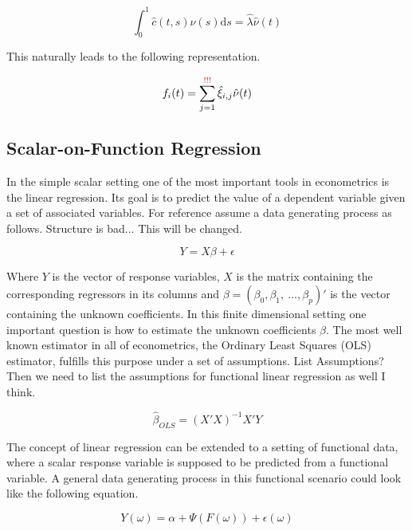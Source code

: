 \documentclass[11pt,twoside,a4paper]{article}
\begin{document}
	\begin{equation}
		\int_{0}^{1}\hat{c}(t,s)\hat{\nu}(s) \mathrm{d}s = \hat{\lambda} \hat{\nu}(t)
	\end{equation}
	
	This naturally leads to the following representation.
	
	\begin{equation}
		f_i(t) = \sum_{j = 1}^{{\color{red} !!!}} \hat{\xi}_{i,j} \hat{\nu}(t)
	\end{equation}
	
	\subsection{Scalar-on-Function Regression}
	In the simple scalar setting one of the most important tools in econometrics is the linear regression. Its goal is to predict the value of a dependent variable given a set of associated variables. For reference assume a data generating process as follows. {\color{red} Structure is bad... This will be changed.}
	
	\begin{equation}
		Y = X\beta + \epsilon
	\end{equation}
	
	Where $Y$ is the vector of response variables, $X$ is the matrix containing the corresponding regressors in its columns and $\beta = (\beta_0, \beta_1, \: \dots, \beta_p)'$ is the vector containing the unknown coefficients.
	In this finite dimensional setting one important question is how to estimate the unknown coefficients $\beta$. The most well known estimator in all of econometrics, the Ordinary Least Squares (OLS) estimator, fulfills this purpose under a set of assumptions. {\color{red}List Assumptions? Then we need to list the assumptions for functional linear regression as well I think.}
	
	\begin{equation}
		\hat{\beta}_{OLS} = (X'X)^{-1}X'Y
	\end{equation}
	
	The concept of linear regression can be extended to a setting of functional data, where a scalar response variable is supposed to be predicted from a functional variable. 
	A general data generating process in this functional scenario could look like the following equation.
	
	\begin{equation}
		Y(\omega) = \alpha + \Psi\left(F(\omega)\right) + \epsilon(\omega)
	\end{equation}
	
\end{document}
